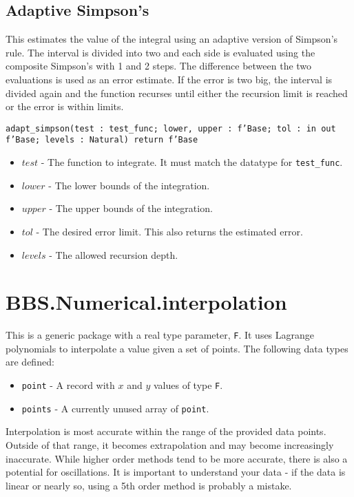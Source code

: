 \documentclass[10pt, openany]{book}
\newcommand{\function}[1]{\texttt{#1}}
\newcommand{\datatype}[1]{\texttt{#1}}
\begin{document}
\subsection{Adaptive Simpson's}
This estimates the value of the integral using an adaptive version of Simpson's rule.  The interval is divided into two and each side is evaluated using the composite Simpson's with 1 and 2 steps.  The difference between the two evaluations is used as an error estimate.  If the error is two big, the interval is divided again and the function recurses until either the recursion limit is reached or the error is within limits.

\function{adapt\_simpson(test : test\_func; lower, upper : f'Base; tol : in out f'Base;  levels : Natural) return f'Base}
\begin{itemize}
  \item $test$ - The function to integrate.  It must match the datatype for \datatype{test\_func}.
  \item $lower$ - The lower bounds of the integration.
  \item $upper$ - The upper bounds of the integration.
  \item $tol$ - The desired error limit.  This also returns the estimated error.
  \item $levels$ - The allowed recursion depth.
\end{itemize}

\section{BBS.Numerical.interpolation}
This is a generic package with a real type parameter, \datatype{F}.  It uses Lagrange polynomials to interpolate a value given a set of points.  The following data types are defined:
\begin{itemize}
  \item \datatype{point} - A record with $x$ and $y$ values of type \datatype{F}.
  \item \datatype{points} - A currently unused array of \datatype{point}.
\end{itemize}
Interpolation is most accurate within the range of the provided data points.  Outside of that range, it becomes extrapolation and may become increasingly inaccurate.  While higher order methods tend to be more accurate, there is also a potential for oscillations.  It is important to understand your data - if the data is linear or nearly so, using a 5th order method is probably a mistake.
\end{document}
